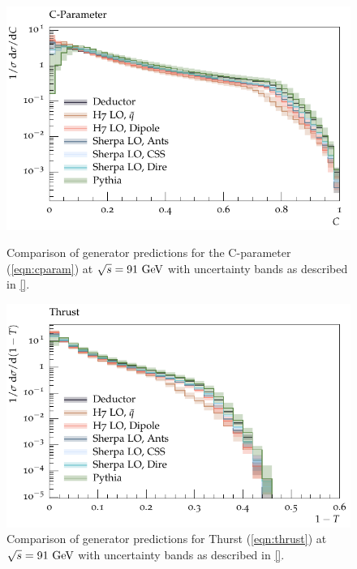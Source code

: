 \begin{figure}[h]
  \centering
  \begin{minipage}[t]{0.49\textwidth}
    \includegraphics[width=1\textwidth]{plots/EE-91-MuShower/MC_EETOJETS/CParameter.pdf}
    \caption{Comparison of generator predictions for the C-parameter (\ref{eqn:cparam}) at $\sqrt{s}=91~\textrm{GeV}$ with uncertainty bands as described in \ref{}.}
    \label{fig:ee:cparam:91}
  \end{minipage}
  \begin{minipage}[t]{0.49\textwidth}
    \includegraphics[width=1\textwidth]{plots/EE-91-MuShower/MC_EETOJETS/Thrust.pdf}
    \caption{Comparison of generator predictions for Thurst (\ref{eqn:thrust}) at $\sqrt{s}=91~\textrm{GeV}$ with uncertainty bands as described in \ref{}.}
	\label{fig:ee:thrust:91}
  \end{minipage}
\end{figure}

